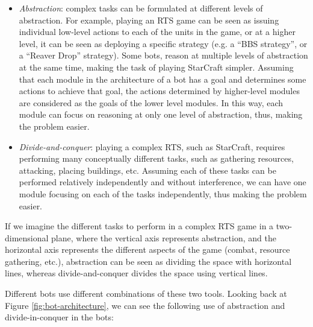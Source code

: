 \documentclass[journal]{IEEEtran}
\begin{document}
\begin{itemize}
\item {\em Abstraction}: complex tasks can be formulated at different levels of abstraction. For example, playing an RTS game can be seen as issuing individual low-level actions to each of the units in the game, or at a higher level, it can be seen as deploying a specific strategy (e.g. a ``BBS strategy'', or a ``Reaver Drop'' strategy). Some bots, reason at multiple levels of abstraction at the same time, making the task of playing StarCraft simpler. Assuming that each module in the architecture of a bot has a goal and determines some actions to achieve that goal, the actions determined by higher-level modules are considered as the goals of the lower level modules. In this way, each module can focus on reasoning at only one level of abstraction, thus, making the problem easier.

\item {\em Divide-and-conquer}: playing a complex RTS, such as StarCraft, requires performing many conceptually different tasks, such as gathering resources, attacking, placing buildings, etc. Assuming each of these tasks can be performed relatively independently and without interference, we can have one module focusing on each of the tasks independently, thus making the problem easier. 
\end{itemize}

If we imagine the different tasks to perform in a complex RTS game in a two-dimensional plane, where the vertical axis represents abstraction, and the horizontal axis represents the different aspects of the game (combat, resource gathering, etc.), abstraction can be seen as dividing the space with horizontal lines, whereas divide-and-conquer divides the space using vertical lines.

Different bots use different combinations of these two tools. Looking back at Figure \ref{fig:bot-architecture}, we can see the following use of abstraction and divide-in-conquer in the bots:
\end{document}

